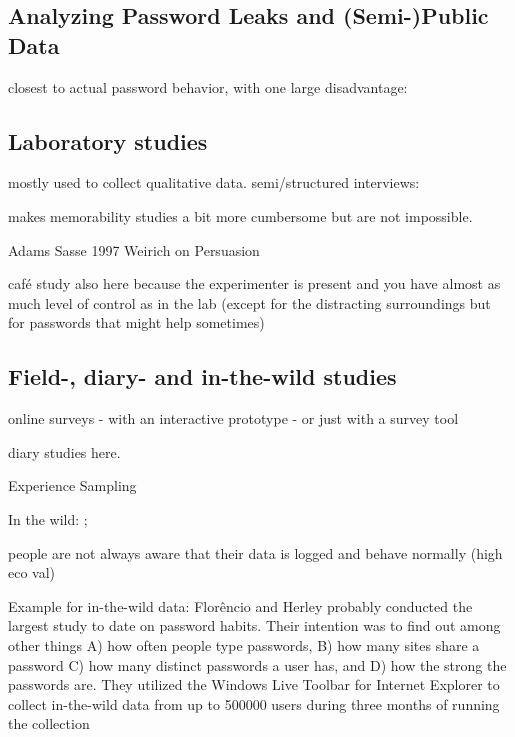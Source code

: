 \subsection{Analyzing Password Leaks and (Semi-)Public Data}
closest to actual password behavior, with one large disadvantage: 
\cite{Bonneau2012LinguisticProperties}
\cite{Bonneau2012ScienceOfGuessing}
\cite{Veras2012VisualizingSemanticsPasswords}
\cite{Wash2016UnderstandingPasswordChoices}


\subsection{Laboratory studies}
mostly used to collect qualitative data.
semi/structured interviews: \cite{Stobert2014PasswordLifeCycle}


makes memorability studies a bit more cumbersome but are not impossible. 

Adams Sasse 1997 \cite{Adams1997MakingPWsSecureAndUsable}
Weirich on Persuasion \cite{Weirich2001PrettyGoodPersuasion, Weirich2005PersuasivePasswordSecurity}

café study also here because the experimenter is present and you have almost as much level of control as in the lab (except for the distracting surroundings but for passwords that might help sometimes)
\cite{VonZezschwitz2013SurvivalShortest}

\subsection{Field-, diary- and in-the-wild studies}

online surveys 
- with an interactive prototype 
- or just with a survey tool

diary studies here.  \cite{Hayashi2011DiaryStudyPWs}

Experience Sampling \cite{Consolvo2003ESM}

In the wild: \cite{Chamberlain2012ResearchInTheWild}; \cite{Renaud2017LessonsLearnedNudges}

people are not always aware that their data is logged and behave normally (high eco val)

Example for in-the-wild data: 
Flor\^{e}ncio and Herley probably conducted the largest study to date on password habits. Their intention was to find out among other things A) how often people type passwords, B) how many sites share a password C) how many distinct passwords a user has, and D) how the strong the passwords are. They utilized the Windows Live Toolbar for Internet Explorer to collect in-the-wild data from up to 500000 users during three months of running the collection

